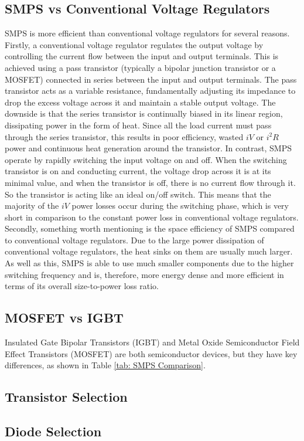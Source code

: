     \subsection{SMPS vs Conventional Voltage Regulators}
        SMPS is more efficient than conventional voltage regulators for several reasons. 
        Firstly, a conventional voltage regulator regulates the output voltage by controlling the current flow between the input and output terminals. This is achieved using a pass transistor (typically a bipolar junction transistor or a MOSFET) connected in series between the input and output terminals. The pass transistor acts as a variable resistance, fundamentally adjusting its impedance to drop the excess voltage across it and maintain a stable output voltage. The downside is that the series transistor is continually biased in its linear region, dissipating power in the form of heat. Since all the load current must pass through the series transistor, this results in poor efficiency, wasted \(iV\) or \(i^2R\) power and continuous heat generation around the transistor. In contrast, SMPS operate by rapidly switching the input voltage on and off. When the switching transistor is on and conducting current, the voltage drop across it is at its minimal value, and when the transistor is off, there is no current flow through it. So the transistor is acting like an ideal on/off switch. This means that the majority of the \(iV\) power losses occur during the switching phase, which is very short in comparison to the constant power loss in conventional voltage regulators.
        Secondly, something worth mentioning is the space efficiency of SMPS compared to conventional voltage regulators. Due to the large power dissipation of conventional voltage regulators, the heat sinks on them are usually much larger. As well as this, SMPS is able to use much smaller components due to the higher switching frequency and is, therefore, more energy dense and more efficient in terms of its overall size-to-power loss ratio.

    \subsection{MOSFET vs IGBT}
        Insulated Gate Bipolar Transistors (IGBT) and Metal Oxide Semiconductor Field Effect Transistors (MOSFET) are both semiconductor devices, but they have key differences, as shown in Table \ref{tab: SMPS Comparison}.

        

    \subsection{Transistor Selection}

    \subsection{Diode Selection}